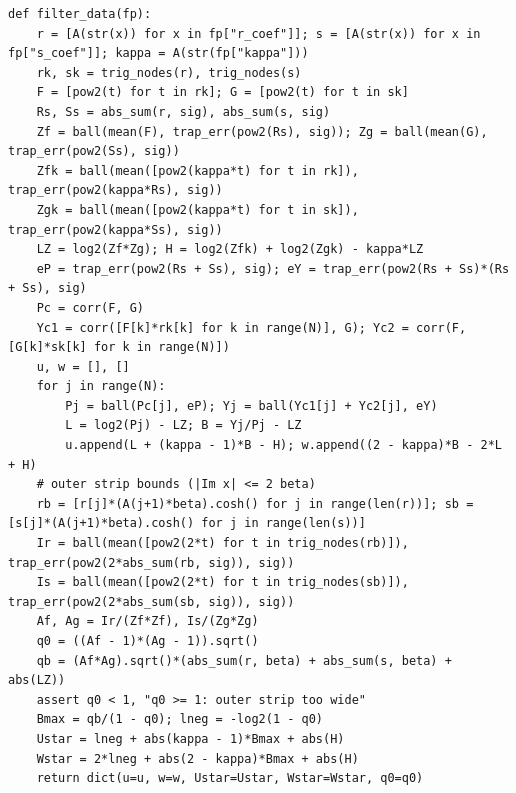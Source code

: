 \documentclass[10pt,a4paper]{article}
\begin{document}
\begin{lstlisting}
def filter_data(fp):
    r = [A(str(x)) for x in fp["r_coef"]]; s = [A(str(x)) for x in fp["s_coef"]]; kappa = A(str(fp["kappa"]))
    rk, sk = trig_nodes(r), trig_nodes(s)
    F = [pow2(t) for t in rk]; G = [pow2(t) for t in sk]
    Rs, Ss = abs_sum(r, sig), abs_sum(s, sig)
    Zf = ball(mean(F), trap_err(pow2(Rs), sig)); Zg = ball(mean(G), trap_err(pow2(Ss), sig))
    Zfk = ball(mean([pow2(kappa*t) for t in rk]), trap_err(pow2(kappa*Rs), sig))
    Zgk = ball(mean([pow2(kappa*t) for t in sk]), trap_err(pow2(kappa*Ss), sig))
    LZ = log2(Zf*Zg); H = log2(Zfk) + log2(Zgk) - kappa*LZ
    eP = trap_err(pow2(Rs + Ss), sig); eY = trap_err(pow2(Rs + Ss)*(Rs + Ss), sig)
    Pc = corr(F, G)
    Yc1 = corr([F[k]*rk[k] for k in range(N)], G); Yc2 = corr(F, [G[k]*sk[k] for k in range(N)])
    u, w = [], []
    for j in range(N):
        Pj = ball(Pc[j], eP); Yj = ball(Yc1[j] + Yc2[j], eY)
        L = log2(Pj) - LZ; B = Yj/Pj - LZ
        u.append(L + (kappa - 1)*B - H); w.append((2 - kappa)*B - 2*L + H)
    # outer strip bounds (|Im x| <= 2 beta)
    rb = [r[j]*(A(j+1)*beta).cosh() for j in range(len(r))]; sb = [s[j]*(A(j+1)*beta).cosh() for j in range(len(s))]
    Ir = ball(mean([pow2(2*t) for t in trig_nodes(rb)]), trap_err(pow2(2*abs_sum(rb, sig)), sig))
    Is = ball(mean([pow2(2*t) for t in trig_nodes(sb)]), trap_err(pow2(2*abs_sum(sb, sig)), sig))
    Af, Ag = Ir/(Zf*Zf), Is/(Zg*Zg)
    q0 = ((Af - 1)*(Ag - 1)).sqrt()
    qb = (Af*Ag).sqrt()*(abs_sum(r, beta) + abs_sum(s, beta) + abs(LZ))
    assert q0 < 1, "q0 >= 1: outer strip too wide"
    Bmax = qb/(1 - q0); lneg = -log2(1 - q0)
    Ustar = lneg + abs(kappa - 1)*Bmax + abs(H)
    Wstar = 2*lneg + abs(2 - kappa)*Bmax + abs(H)
    return dict(u=u, w=w, Ustar=Ustar, Wstar=Wstar, q0=q0)


\end{lstlisting}
\end{document}
